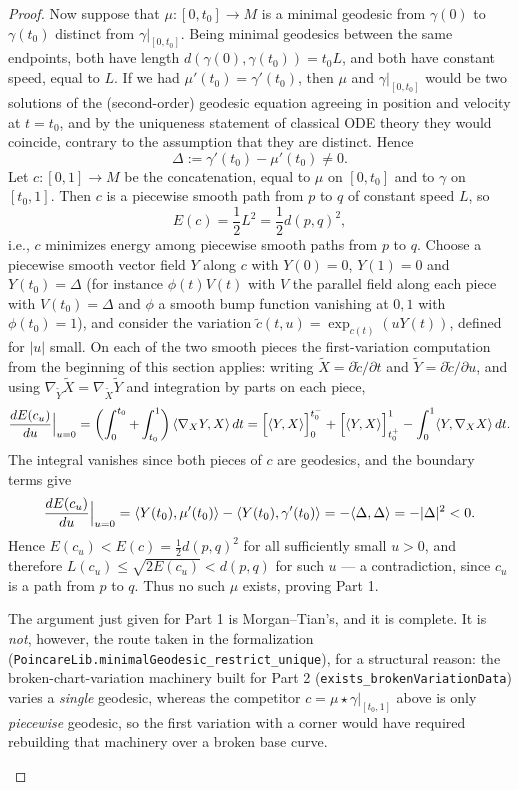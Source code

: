 \begin{proof}
Now suppose that $\mu\colon [0,t_0]\to M$ is a minimal geodesic from
$\gamma(0)$ to $\gamma(t_0)$ distinct from $\gamma|_{[0,t_0]}$. Being
minimal geodesics between the same endpoints, both have length
$d(\gamma(0),\gamma(t_0))=t_0L$, and both have constant speed, equal
to $L$. If we had $\mu'(t_0)=\gamma'(t_0)$, then $\mu$ and
$\gamma|_{[0,t_0]}$ would be two solutions of the (second-order)
geodesic equation agreeing in position and velocity at $t=t_0$, and
by the uniqueness statement of classical ODE theory they would
coincide, contrary to the assumption that they are distinct. Hence
$$\Delta:=\gamma'(t_0)-\mu'(t_0)\not=0.$$
Let $c\colon [0,1]\to M$ be the concatenation, equal to $\mu$ on
$[0,t_0]$ and to $\gamma$ on $[t_0,1]$. Then $c$ is a piecewise
smooth path from $p$ to $q$ of constant speed $L$, so
$$E(c)=\frac{1}{2}L^2=\frac{1}{2}d(p,q)^2,$$
i.e., $c$ minimizes energy among piecewise smooth paths from $p$ to
$q$. Choose a piecewise smooth vector field $Y$ along $c$ with
$Y(0)=0$, $Y(1)=0$ and $Y(t_0)=\Delta$ (for instance $\phi(t)V(t)$
with $V$ the parallel field along each piece with
$V(t_0)=\Delta$ and $\phi$ a smooth bump function vanishing at $0,1$
with $\phi(t_0)=1$), and consider the variation
$\tilde c(t,u)=\exp_{c(t)}(uY(t))$, defined for $|u|$ small. On each
of the two smooth pieces the first-variation computation from the
beginning of this section applies: writing $\widetilde X=\partial
\tilde c/\partial t$ and $\widetilde Y=\partial\tilde c/\partial u$,
and using $\nabla_{\widetilde Y}\widetilde X=\nabla_{\widetilde
X}\widetilde Y$ and integration by parts on each piece,
$$\frac{dE(c_u)}{du}\Bigl|_{u=0}\Bigr.
=\left(\int_0^{t_0}+\int_{t_0}^1\right)
\langle\nabla_{X}Y,X\rangle\,dt
=\Bigl[\langle Y,X\rangle\Bigr]_0^{t_0^-}
+\Bigl[\langle Y,X\rangle\Bigr]_{t_0^+}^{1}
-\int_0^1\langle Y,\nabla_XX\rangle\,dt.$$
The integral vanishes since both pieces of $c$ are geodesics, and
the boundary terms give
$$\frac{dE(c_u)}{du}\Bigl|_{u=0}\Bigr.
=\langle Y(t_0),\mu'(t_0)\rangle-\langle
Y(t_0),\gamma'(t_0)\rangle=-\langle \Delta,\Delta\rangle
=-|\Delta|^2<0.$$
Hence $E(c_u)<E(c)=\frac{1}{2}d(p,q)^2$ for all sufficiently small
$u>0$, and therefore $L(c_u)\le\sqrt{2E(c_u)}<d(p,q)$ for such $u$
--- a contradiction, since $c_u$ is a path from $p$ to $q$. Thus no
such $\mu$ exists, proving Part 1.

\begin{remark}
\label{rem:part1-corner-rigidity-route}
\leanok
The argument just given for Part 1 is Morgan--Tian's, and it is complete.  It is
\emph{not}, however, the route taken in the formalization
(\texttt{PoincareLib.minimalGeodesic\_restrict\_unique}), for a structural reason: the
broken-chart-variation machinery built for Part 2
(\texttt{exists\_brokenVariationData}) varies a \emph{single} geodesic, whereas the
competitor $c=\mu\star\gamma|_{[t_0,1]}$ above is only \emph{piecewise} geodesic, so the
first variation with a corner would have required rebuilding that machinery over a broken
base curve.


\end{remark}
\end{proof}
